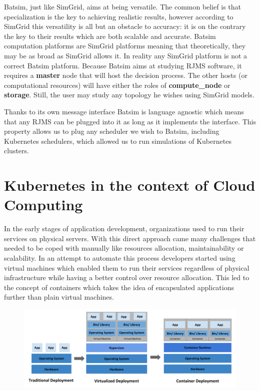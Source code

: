 Batsim, just like SimGrid, aims at being versatile. The common belief is that
specialization is the key to achieving realistic results, however according to
SimGrid this versatility is all but an obstacle to
accuracy\cite{casanova:hal-01017319}: it is on the contrary the key to their
results which are both scalable and accurate. Batsim computation platforms are
SimGrid platforms meaning that theoretically, they may be as broad as SimGrid
allows it. In reality any SimGrid platform is not a correct Batsim platform.
Because Batsim aims at studying RJMS software, it requires a \textbf{master}
node that will host the decision process. The other hosts (or computational
resources) will have either the roles of \textbf{compute\_node} or
\textbf{storage}. Still, the user may study any topology he wishes using
SimGrid models.

Thanks to its own message interface Batsim is language agnostic which means
that any RJMS can be plugged into it as long as it implements the interface.
This property allows us to plug any scheduler we wish to Batsim, including
Kubernetes schedulers, which allowed us to run simulations of Kubernetes
clusters.

\section{Kubernetes in the context of Cloud Computing}

In the early stages of application development, organizations used to run their
services on physical servers. With this direct approach came many challenges
that needed to be coped with manually like resources allocation,
maintainability or scalability. In an attempt to automate this process
developers started using virtual machines which enabled them to run their
services regardless of physical infrastructure while having a better control
over resource allocation.  This led to the concept of containers which takes
the idea of encapsulated applications further than plain virtual machines.

\begin{figure}[h]
	\centering
	\includegraphics[width=\textwidth]{./imgs/container_evolution.png}
	\label{fig:container-evolution}
\end{figure}

